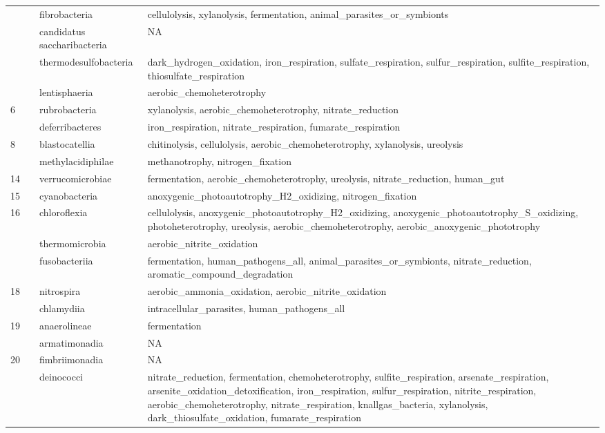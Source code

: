 \documentclass{article}
\begin{document}
\begin{longtable}{|l|c|l|>{\raggedright\arraybackslash}p{6cm}|}
\cline{3-4}
 &  & fibrobacteria & cellulolysis, xylanolysis, fermentation, animal\_parasites\_or\_symbionts\\
\cline{3-4}
 &  & candidatus saccharibacteria & NA\\
\cline{3-4}
 &  & thermodesulfobacteria & dark\_hydrogen\_oxidation, iron\_respiration, sulfate\_respiration, sulfur\_respiration, sulfite\_respiration, thiosulfate\_respiration\\
\cline{3-4}
 &  & lentisphaeria & aerobic\_chemoheterotrophy\\
\hline
6 &  & rubrobacteria & xylanolysis, aerobic\_chemoheterotrophy, nitrate\_reduction\\
\cline{3-4}
 &  & deferribacteres & iron\_respiration, nitrate\_respiration, fumarate\_respiration\\
\hline
8 &  & blastocatellia & chitinolysis, cellulolysis, aerobic\_chemoheterotrophy, xylanolysis, ureolysis\\
\cline{3-4}
 &  & methylacidiphilae & methanotrophy, nitrogen\_fixation\\
\hline
14 &  & verrucomicrobiae & fermentation, aerobic\_chemoheterotrophy, ureolysis, nitrate\_reduction, human\_gut\\
\hline
15 &  & cyanobacteria & anoxygenic\_photoautotrophy\_H2\_oxidizing, nitrogen\_fixation\\
\hline
16 &  & chloroflexia & cellulolysis, anoxygenic\_photoautotrophy\_H2\_oxidizing, anoxygenic\_photoautotrophy\_S\_oxidizing, photoheterotrophy, ureolysis, aerobic\_chemoheterotrophy, aerobic\_anoxygenic\_phototrophy\\
\cline{3-4}
 &  & thermomicrobia & aerobic\_nitrite\_oxidation\\
\cline{3-4}
 &  & fusobacteriia & fermentation, human\_pathogens\_all, animal\_parasites\_or\_symbionts, nitrate\_reduction, aromatic\_compound\_degradation\\
\hline
18 &  & nitrospira & aerobic\_ammonia\_oxidation, aerobic\_nitrite\_oxidation\\
\cline{3-4}
 &  & chlamydiia & intracellular\_parasites, human\_pathogens\_all\\
\hline
19 &  & anaerolineae & fermentation\\
\cline{3-4}
 &  & armatimonadia & NA\\
\hline
20 &  & fimbriimonadia & NA\\
\cline{3-4}
 &  & deinococci & nitrate\_reduction, fermentation, chemoheterotrophy, sulfite\_respiration, arsenate\_respiration, arsenite\_oxidation\_detoxification, iron\_respiration, sulfur\_respiration, nitrite\_respiration, aerobic\_chemoheterotrophy, nitrate\_respiration, knallgas\_bacteria, xylanolysis, dark\_thiosulfate\_oxidation, fumarate\_respiration\\

\end{longtable}
\end{document}
